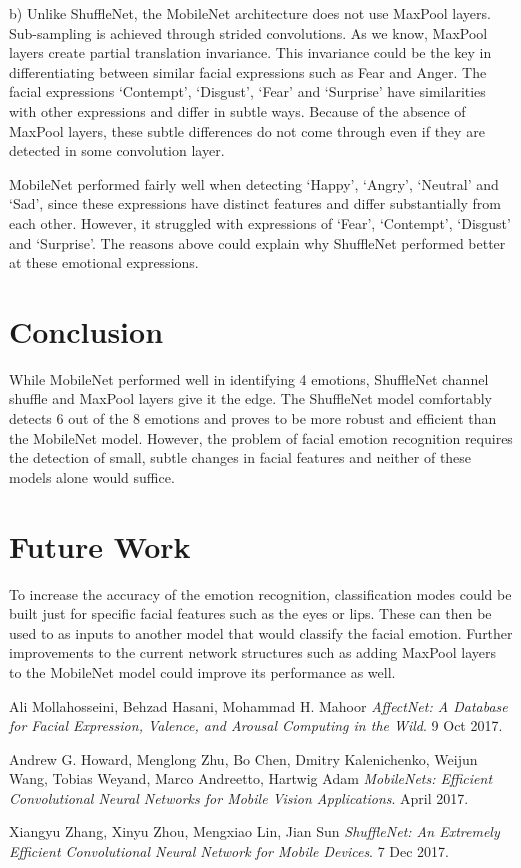 \documentclass[10pt,twocolumn,letterpaper]{article}
\begin{document}
b) Unlike ShuffleNet, the MobileNet architecture does not use MaxPool layers. Sub-sampling is achieved through strided convolutions. As we know, MaxPool layers create partial translation invariance. This invariance could be the key in differentiating between similar facial expressions such as Fear and Anger. The facial expressions ‘Contempt’, ‘Disgust’, ‘Fear’ and ‘Surprise’ have similarities with other expressions and differ in subtle ways. Because of the absence of MaxPool layers, these subtle differences do not come through even if they are detected in some convolution layer.

MobileNet performed fairly well when detecting ‘Happy’, ‘Angry’, ‘Neutral’ and ‘Sad’, since these expressions have distinct features and differ substantially from each other. However, it struggled with expressions of ‘Fear’, ‘Contempt’, ‘Disgust’ and ‘Surprise’. The reasons above could explain why ShuffleNet performed better at these emotional expressions.

\section{Conclusion}
While MobileNet performed well in identifying 4 emotions, ShuffleNet channel shuffle and MaxPool layers give it the edge. The ShuffleNet model comfortably detects 6 out of the 8 emotions and proves to be more robust and efficient than the MobileNet model.
However, the problem of facial emotion recognition requires the detection of small, subtle changes in facial features and neither of these models alone would suffice.

\section{Future Work}
To increase the accuracy of the emotion recognition, classification modes could be built just for specific facial features such as the eyes or lips. These can then be used to as inputs to another model that would classify the facial emotion.
Further improvements to the current network structures such as adding MaxPool layers to the MobileNet model could improve its performance as well.


{\small




\begin{thebibliography}{9}

Ali Mollahosseini, Behzad Hasani, Mohammad H. Mahoor
\textit{ AffectNet: A Database for Facial Expression, Valence, and Arousal Computing in the Wild}. 
9 Oct 2017.

Andrew G. Howard, Menglong Zhu, Bo Chen, Dmitry Kalenichenko, Weijun Wang, Tobias Weyand, Marco Andreetto, Hartwig Adam
\textit{MobileNets: Efficient Convolutional Neural Networks for Mobile Vision Applications}. 
April 2017.

Xiangyu Zhang, Xinyu Zhou, Mengxiao Lin, Jian Sun
\textit{ShuffleNet: An Extremely Efficient Convolutional Neural Network for Mobile Devices}. 
7 Dec 2017.
 

\end{thebibliography}



}
\end{document}
